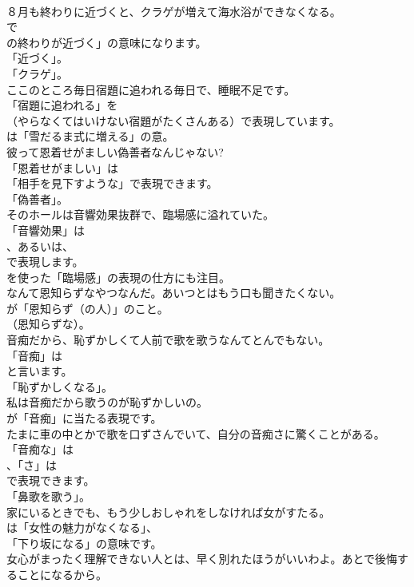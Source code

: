 \documentclass[8pt]{extreport}
\begin{document}
\begin{CJK}{UTF8}{min}
\\	８月も終わりに近づくと、クラゲが増えて海水浴ができなくなる。 
\\	で
\\	の終わりが近づく」の意味になります。
\\	「近づく」。
\\	「クラゲ」。	
\\	ここのところ毎日宿題に追われる毎日で、睡眠不足です。 
\\	「宿題に追われる」を 
\\	（やらなくてはいけない宿題がたくさんある）で表現しています。
\\	は「雪だるま式に増える」の意。	
\\	彼って恩着せがましい偽善者なんじゃない? 
\\	「恩着せがましい」は
\\	「相手を見下すような」で表現できます。
\\	「偽善者」。	
\\	そのホールは音響効果抜群で、臨場感に溢れていた。 
\\	「音響効果」は
\\	、あるいは、
\\	で表現します。
\\	を使った「臨場感」の表現の仕方にも注目。	
\\	なんて恩知らずなやつなんだ。あいつとはもう口も聞きたくない。 
\\	が「恩知らず（の人）」のこと。
\\	（恩知らずな）。	
\\	音痴だから、恥ずかしくて人前で歌を歌うなんてとんでもない。 
\\	「音痴」は
\\	と言います。
\\	「恥ずかしくなる」。	
\\	私は音痴だから歌うのが恥ずかしいの。 
\\	が「音痴」に当たる表現です。	
\\	たまに車の中とかで歌を口ずさんでいて、自分の音痴さに驚くことがある。 
\\	「音痴な」は
\\	、「さ」は
\\	で表現できます。
\\	「鼻歌を歌う」。	
\\	家にいるときでも、もう少しおしゃれをしなければ女がすたる。 
\\	は「女性の魅力がなくなる」、
\\	「下り坂になる」の意味です。	
\\	女心がまったく理解できない人とは、早く別れたほうがいいわよ。あとで後悔することになるから。 

\end{CJK}
\end{document}
